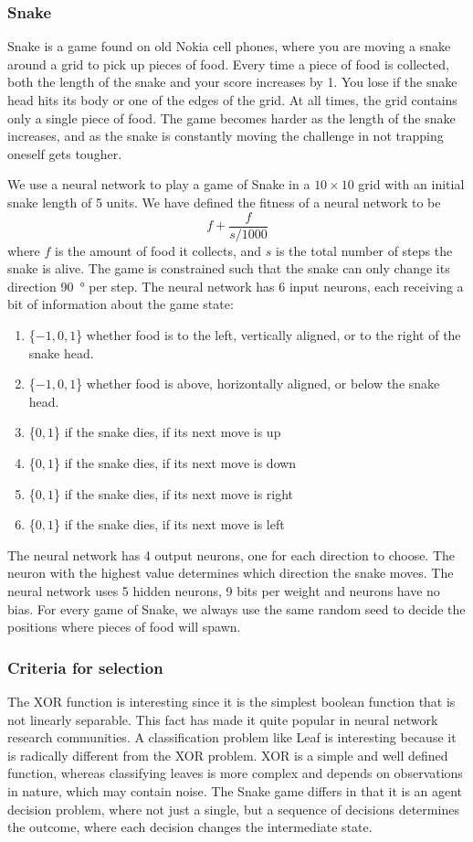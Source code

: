 \subsubsection{Snake}
Snake is a game found on old Nokia cell phones, where you are moving a snake around a grid to pick up pieces of food.
Every time a piece of food is collected, both the length of the snake and your score increases by 1.
You lose if the snake head hits its body or one of the edges of the grid.
At all times, the grid contains only a single piece of food.
The game becomes harder as the length of the snake increases, and as the snake is constantly moving the challenge in not trapping oneself gets tougher.

We use a neural network to play a game of Snake in a $10\times10$ grid with an initial snake length of 5 units.
We have defined the fitness of a neural network to be 
\[f + \frac{f}{s/1000}\]
where $f$ is the amount of food it collects, and $s$ is the total number of steps the snake is alive. The game is constrained such that the snake can only change its direction \SI{90}{\degree} per step. The neural network has 6 input neurons, each receiving a bit of information about the game state:
\begin{enumerate}
  \item \{$-1, 0, 1$\} whether food is to the left, vertically aligned, or to the right of the snake head.
  \item \{$-1, 0, 1$\} whether food is above, horizontally aligned, or below the snake head.
  \item \{$0, 1$\} if the snake dies, if its next move is up
  \item \{$0, 1$\} if the snake dies, if its next move is down
  \item \{$0, 1$\} if the snake dies, if its next move is right 
  \item \{$0, 1$\} if the snake dies, if its next move is left
\end{enumerate}
The neural network has 4 output neurons, one for each direction to choose. The neuron with the highest value determines which direction the snake moves.
The neural network uses 5 hidden neurons, 9 bits per weight and neurons have no bias.
For every game of Snake, we always use the same random seed to decide the positions where pieces of food will spawn.

\subsubsection{Criteria for selection}
The XOR function is interesting since it is the simplest boolean function that is not linearly separable.
This fact has made it quite popular in neural network research communities\cite{masterThesisGANN}.
A classification problem like Leaf is interesting because it is radically different from the XOR problem.
XOR is a simple and well defined function, whereas classifying leaves is more complex and depends on observations in nature, which may contain noise.
The Snake game differs in that it is an agent decision problem, where not just a single, but a sequence of decisions determines the outcome, where each decision changes the intermediate state.
